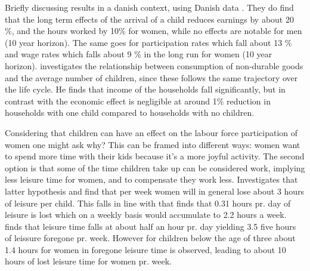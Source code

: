Briefly discussing results in a danish context, using Danish data \textcite{kleven_children_2019}. They do find that the long term effects of the arrival of a child reduces earnings by about 20 \%, and the hours worked by 10\% for women, while no effects are notable for men (10 year horizon). The same goes for participation rates which fall about 13 \% and wage rates which falls about 9 \% in the long run for women (10 year horizon). \textcite{jorgensen_life-cycle_2017} investigates the relationship between consumption of non-durable goods and the average number of children, since these follows the same trajectory over the life cycle. He finds that income of the households fall significantly, but in contrast with \textcite{kleven_children_2019} the economic effect is negligible at around 1\% reduction in households with one child compared to households with no children. 

Considering that children can have an effect on the labour force participation of women one might ask why? This can be framed into different ways: women want to spend more time with their kids because it's a more joyful activity. The second option is that some of the time children take up can be considered work, implying less leisure time for women, and to compensate they work less. \textcite{firestone_estimation_1988} Investigates that latter hypothesis and find that per week women will in general lose about 3 hours of leisure per child. This falls in line with \textcite{thrane_men_2000} that finds that 0.31 hours pr. day of leisure is lost which on a weekly basis would accumulate to 2.2 hours a week. \textcite{ekert-jaffe_time_2015} finds that leisure time falls at about half an hour pr. day yielding 3.5 five hours of leissure foregone pr. week. However for children below the age of three about 1.4 hours for women in foregone leisure time is observed, leading to about 10 hours of lost leisure time for women pr. week.  